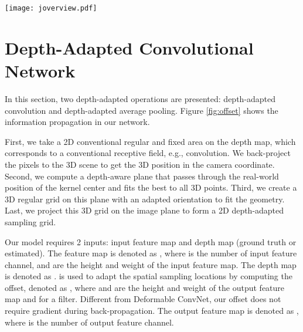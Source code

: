 \documentclass[lettersize,journal]{IEEEtran}
\begin{document}
\begin{figure*}[ht]
\centering
\texttt{[image: joverview.pdf]}
\caption{Illustration of depth-adapted CNN. On the left we show the example of a 3  3 kernel: a) shows a standard 2D convolution with dilation equal to 1. b) shows the offset computed from deformable convolution \cite{dai2017deformable}. c) is the available depth data. The represented figure shows a linear change with the depth value. From left to right, the scene becomes deeper.  d) illustrates offset computed by Z-ACN which is adapted to depth. On the right, we illustrate the overview of our approach. \textbf{LMS} stands for Least Mean Square algorithm.   are the 3D unit axis. Firstly, pixels within the 2D receptive field are back-projected to 3D space to form a point cloud, based on which a 3D plane is computed with normal  . Secondly, a new 3  3 grid on the 3D space is created with the help of 3D axis  which are perpendicular to the normal . Finally, the 3D grid is projected to the image plane, forming our depth-adapted sampling position. Zoom in for more details on the depth-guided sampling position on the RGB image.}
\label{fig:offset}
\end{figure*}




\section{Depth-Adapted Convolutional Network}

In this section, two depth-adapted operations are presented: depth-adapted convolution and depth-adapted average pooling. Figure \ref{fig:offset} shows the information propagation in our network.

First, we take a 2D conventional regular and fixed area on the depth map, which corresponds to a conventional receptive field, e.g.,  convolution. We back-project the pixels to the 3D scene to get the 3D position in the camera coordinate. Second, we compute a depth-aware plane that passes through the real-world position of the kernel center and fits the best to all 3D points. Third, we create a 3D regular grid on this plane with an adapted orientation to fit the geometry. Last, we project this 3D grid on the image plane to form a 2D depth-adapted sampling grid.

Our model requires 2 inputs: input feature map and depth map (ground truth or estimated). The feature map is denoted as , where  is the number of input feature channel,  and  are the height and weight of the input feature map. The depth map is denoted as .  is used to adapt the spatial sampling locations by computing the offset, denoted as , where  and  are the height and weight of the output feature map and  for a  filter. Different from Deformable ConvNet, our offset does not require gradient during back-propagation. The output feature map is denoted as , where  is the number of output feature channel.
\end{document}
